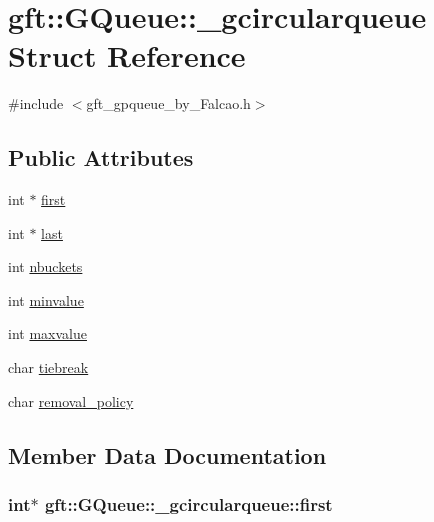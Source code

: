 \hypertarget{structgft_1_1GQueue_1_1__gcircularqueue}{}\section{gft\+:\+:G\+Queue\+:\+:\+\_\+gcircularqueue Struct Reference}
\label{structgft_1_1GQueue_1_1__gcircularqueue}


{\ttfamily \#include $<$gft\+\_\+gpqueue\+\_\+by\+\_\+\+Falcao.\+h$>$}

\subsection*{Public Attributes}
\begin{DoxyCompactItemize}
\item 
int $\ast$ \hyperlink{structgft_1_1GQueue_1_1__gcircularqueue_aabbe2dc3b5fb0aed62aa952b72dda244}{first}
\item 
int $\ast$ \hyperlink{structgft_1_1GQueue_1_1__gcircularqueue_af6757641a12f8941ae6647dc25459bd9}{last}
\item 
int \hyperlink{structgft_1_1GQueue_1_1__gcircularqueue_a16e352842988e1d437bddb69636d2a31}{nbuckets}
\item 
int \hyperlink{structgft_1_1GQueue_1_1__gcircularqueue_a60003a1b76dc5941cddb111e03a3a0dd}{minvalue}
\item 
int \hyperlink{structgft_1_1GQueue_1_1__gcircularqueue_a0c7ec2c2f5a55366dd2ba1340338b192}{maxvalue}
\item 
char \hyperlink{structgft_1_1GQueue_1_1__gcircularqueue_a8c5f0458ca42a97a85f67e26d29ce844}{tiebreak}
\item 
char \hyperlink{structgft_1_1GQueue_1_1__gcircularqueue_a345e7c12de26b812fbbd88694eb777f6}{removal\+\_\+policy}
\end{DoxyCompactItemize}


\subsection{Member Data Documentation}
\subsubsection[{\texorpdfstring{first}{first}}]{\setlength{\rightskip}{0pt plus 5cm}int$\ast$ gft\+::\+G\+Queue\+::\+\_\+gcircularqueue\+::first}\hypertarget{structgft_1_1GQueue_1_1__gcircularqueue_aabbe2dc3b5fb0aed62aa952b72dda244}{}\label{structgft_1_1GQueue_1_1__gcircularqueue_aabbe2dc3b5fb0aed62aa952b72dda244}
